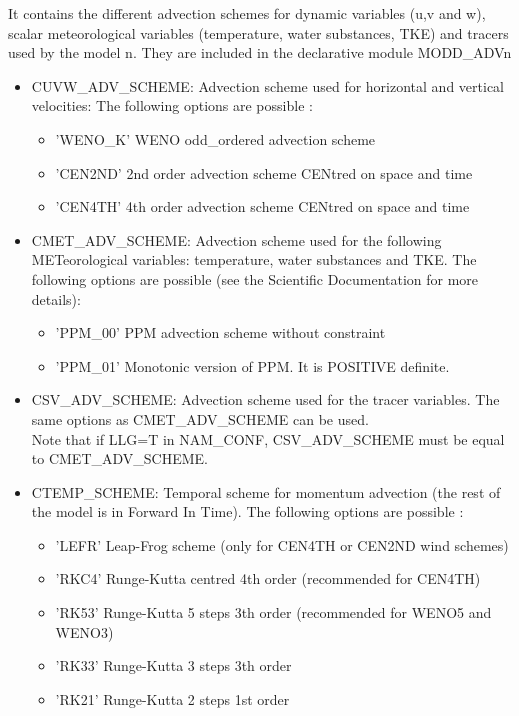 It contains the different advection schemes for dynamic variables (u,v and w), scalar
meteorological variables
(temperature, water substances, TKE) and tracers used by the model n. 
They are included in the declarative module MODD\_ADVn
\begin{itemize}

\item
{}
CUVW\_ADV\_SCHEME: Advection scheme used for 
horizontal and vertical velocities:
The following options
are possible : 
\begin{itemize}
\item 'WENO\_K' WENO odd\_ordered advection scheme
\item 'CEN2ND' 2nd order advection scheme CENtred on space and time
\item 'CEN4TH' 4th order advection scheme CENtred on space and time
\end{itemize}

\item
{}
CMET\_ADV\_SCHEME: Advection scheme used for the following METeorological variables:
temperature, water substances and TKE. The following options
are possible (see the Scientific Documentation for more details): 
\begin{itemize}
\item 'PPM\_00' PPM advection scheme without constraint
\item 'PPM\_01' Monotonic version of PPM. It is POSITIVE definite.
\end{itemize}


\item
{}
CSV\_ADV\_SCHEME: Advection scheme used for the tracer variables. The same options as CMET\_ADV\_SCHEME can be used.\\

Note that if LLG=T in NAM\_CONF, CSV\_ADV\_SCHEME must be equal to CMET\_ADV\_SCHEME.

\item
{}
CTEMP\_SCHEME: Temporal scheme for momentum advection (the rest of the model is in Forward In Time).
The following options are possible :
\begin{itemize}
\item 'LEFR' Leap-Frog scheme (only for CEN4TH or CEN2ND wind schemes)
\item 'RKC4' Runge-Kutta centred 4th order (recommended for CEN4TH)
\item 'RK53' Runge-Kutta 5 steps 3th order  (recommended for WENO5 and WENO3)
\item 'RK33' Runge-Kutta 3 steps 3th order 
\item 'RK21' Runge-Kutta 2 steps 1st order 
\end{itemize}



\end{itemize}

